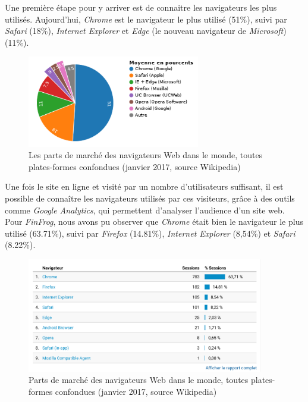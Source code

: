 \bigskip

Une première étape pour y arriver est de connaitre les navigateurs les
plus utilisés. Aujourd'hui, \emph{Chrome} est le navigateur le plus
utilisé (51\%), suivi par \emph{Safari} (18\%), \emph{Internet Explorer}
et \emph{Edge} (le nouveau navigateur de \emph{Microsoft}) (11\%).

\begin{figure}[h]
  \centering
  \includegraphics[height=4cm]{figures/browsers.png}
  \caption{Les parts de marché des navigateurs Web dans le monde, toutes plates-formes confondues (janvier 2017, source Wikipedia)}
\end{figure}

\bigskip

Une fois le site en ligne et visité par un nombre d'utilisateurs
suffisant, il est possible de connaître les navigateurs utilisés par ces
visiteurs, grâce à des outils comme \emph{Google Analytics}, qui
permettent d'analyser l'audience d'un site web. Pour \emph{FinFrog},
nous avons pu observer que \emph{Chrome} était bien le navigateur le
plus utilisé (63.71\%), suivi par \emph{Firefox} (14.81\%),
\emph{Internet Explorer} (8,54\%) et \emph{Safari} (8.22\%).

\begin{figure}[h]
  \centering
  \includegraphics[height=5cm]{figures/FF-browsers.png}
  \caption{Parts de marché des navigateurs Web dans le monde, toutes plates-formes confondues (janvier 2017, source Wikipedia)}
\end{figure}

\bigskip

